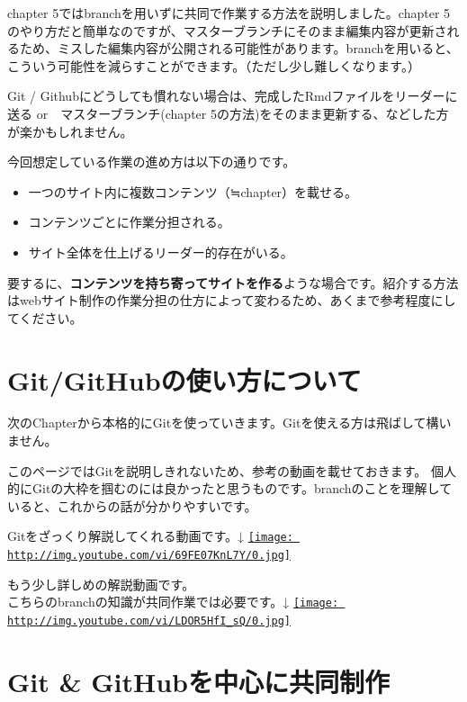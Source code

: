 \documentclass[
]{book}
\providecommand{\tightlist}{%
  \setlength{\itemsep}{0pt}\setlength{\parskip}{0pt}}
\begin{document}
chapter 5ではbranchを用いずに共同で作業する方法を説明しました。chapter 5のやり方だと簡単なのですが、マスターブランチにそのまま編集内容が更新されるため、ミスした編集内容が公開される可能性があります。branchを用いると、こういう可能性を減らすことができます。（ただし少し難しくなります。）

Git / Githubにどうしても慣れない場合は、完成したRmdファイルをリーダーに送る or　マスターブランチ(chapter 5の方法)をそのまま更新する、などした方が楽かもしれません。

今回想定している作業の進め方は以下の通りです。

\begin{itemize}
\tightlist
\item
  一つのサイト内に複数コンテンツ（≒chapter）を載せる。
\item
  コンテンツごとに作業分担される。
\item
  サイト全体を仕上げるリーダー的存在がいる。
\end{itemize}

要するに、\textbf{コンテンツを持ち寄ってサイトを作る}ような場合です。紹介する方法はwebサイト制作の作業分担の仕方によって変わるため、あくまで参考程度にしてください。

\hypertarget{gitgithubux306eux4f7fux3044ux65b9ux306bux3064ux3044ux3066}{%
\chapter{Git/GitHubの使い方について}\label{gitgithubux306eux4f7fux3044ux65b9ux306bux3064ux3044ux3066}}

次のChapterから本格的にGitを使っていきます。Gitを使える方は飛ばして構いません。

このページではGitを説明しきれないため、参考の動画を載せておきます。 個人的にGitの大枠を掴むのには良かったと思うものです。branchのことを理解していると、これからの話が分かりやすいです。

Gitをざっくり解説してくれる動画です。↓
\href{http://www.youtube.com/watch?v=69FE07KnL7Y}{\texttt{[image: http://img.youtube.com/vi/69FE07KnL7Y/0.jpg]}}

もう少し詳しめの解説動画です。\\
こちらのbranchの知識が共同作業では必要です。↓
\href{http://www.youtube.com/watch?v=LDOR5HfI_sQ}{\texttt{[image: http://img.youtube.com/vi/LDOR5HfI\_sQ/0.jpg]}}

\hypertarget{git-githubux3092ux4e2dux5fc3ux306bux5171ux540cux5236ux4f5c}{%
\chapter{Git \& GitHubを中心に共同制作}\label{git-githubux3092ux4e2dux5fc3ux306bux5171ux540cux5236ux4f5c}}
\end{document}
